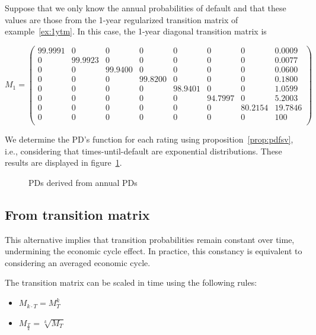 \documentclass[11pt,fleqn]{book} %
\begin{document}
\begin{example}
	\label{ex:pdfsv}
	Suppose that we only know the annual probabilities of default and that these 
	values are those from the 1-year regularized transition matrix of 
	example~\ref{ex:1ytm}. In this case, the 1-year diagonal transition matrix 
	is
	{\small
	\begin{displaymath}
		M_1 = \left(
		\begin{array}{cccccccc}
			99.9991 & 0 & 0 & 0 & 0 & 0 & 0 & 0.0009 \\
			0 & 99.9923 & 0 & 0 & 0 & 0 & 0 & 0.0077 \\
			0 & 0 & 99.9400 & 0 & 0 & 0 & 0 & 0.0600 \\
			0 & 0 & 0 & 99.8200 & 0 & 0 & 0 & 0.1800 \\
			0 & 0 & 0 & 0 & 98.9401 & 0 & 0 & 1.0599 \\
			0 & 0 & 0 & 0 & 0 & 94.7997 & 0 & 5.2003 \\
			0 & 0 & 0 & 0 & 0 & 0 & 80.2154 & 19.7846 \\
			0 & 0 & 0 & 0 & 0 & 0 & 0 & 100 \\
		\end{array}
		\right)
	\end{displaymath}\par}
	We determine the PD's function for each rating using  
	proposition~\ref{prop:pdfsv}, i.e., considering that times-until-default
	are exponential distributions. These results are displayed in 
	figure~\ref{fig:pdfsv}. 
	\begin{figure}[!ht]
		\centering
		\caption{PDs derived from annual PDs}
		\label{fig:pdfsv}
	\end{figure}
\end{example}

\subsection{From transition matrix}
\label{pdftm}

This alternative implies that transition probabilities remain constant
over time, undermining the economic cycle effect. In practice, this constancy
is equivalent to considering an averaged economic cycle.

\begin{proposition}
	The transition matrix can be scaled in time using the following rules:
	\begin{itemize}
		\item $M_{k \cdot T} = M_{T}^k$
		\item $M_{\frac{T}{k}} = \sqrt[k]{M_{T}}$
	\end{itemize}
\end{proposition}
\end{document}
